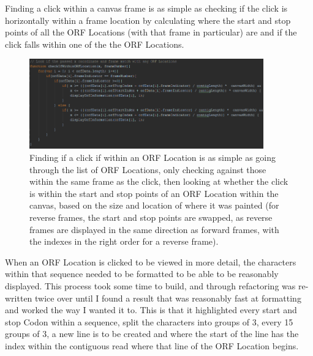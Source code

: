 Finding a click within a canvas frame is as simple as checking if the click is horizontally within a frame location by calculating where the start and stop points of all the ORF Locations (with that frame in particular) are and if the click falls within one of the the ORF Locations.

\begin{figure}[H]
\centering
\includegraphics[width=0.9\textwidth]{images/orfdisplay1}
\caption{Finding if a click if within an ORF Location is as simple as going through the list of ORF Locations, only checking against those within the same frame as the click, then looking at whether the click is within the start and stop points of an ORF Location within the canvas, based on the size and location of where it was painted (for reverse frames, the start and stop points are swapped, as reverse frames are displayed in the same direction as forward frames, with the indexes in the right order for a reverse frame).}
\end{figure}

When an ORF Location is clicked to be viewed in more detail, the characters within that sequence needed to be formatted to be able to be reasonably displayed. This process took some time to build, and through refactoring was re-written twice over until I found a result that was reasonably fast at formatting and worked the way I wanted it to. This is that it highlighted every start and stop Codon within a sequence, split the characters into groups of 3, every 15 groups of 3, a new line is to be created and where the start of the line has the index within the contiguous read where that line of the ORF Location begins.

